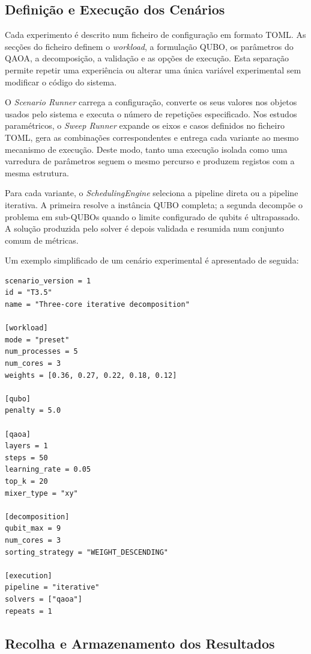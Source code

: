 \subsection{Definição e Execução dos Cenários}

Cada experimento é descrito num ficheiro de configuração em formato TOML. As secções
do ficheiro definem o \textit{workload}, a formulação QUBO, os parâmetros do QAOA, a
decomposição, a validação e as opções de execução. Esta separação permite repetir uma
experiência ou alterar uma única variável experimental sem modificar o código do
sistema.

O \textit{Scenario Runner} carrega a configuração, converte os seus valores nos objetos
usados pelo sistema e executa o número de repetições especificado. Nos estudos
paramétricos, o \textit{Sweep Runner} expande os eixos e casos definidos no ficheiro TOML,
gera as combinações correspondentes e entrega cada variante ao mesmo mecanismo de
execução. Deste modo, tanto uma execução isolada como uma varredura de parâmetros seguem
o mesmo percurso e produzem registos com a mesma estrutura.

Para cada variante, o \textit{SchedulingEngine} seleciona a pipeline direta ou a pipeline
iterativa. A primeira resolve a instância QUBO completa; a segunda decompõe o problema em
sub-QUBOs quando o limite configurado de qubits é ultrapassado. A solução produzida pelo
solver é depois validada e resumida num conjunto comum de métricas.

Um exemplo simplificado de um cenário experimental é apresentado de seguida:

\begin{lstlisting}[caption={Exemplo simplificado de um cenário experimental em TOML.}]
scenario_version = 1
id = "T3.5"
name = "Three-core iterative decomposition"

[workload]
mode = "preset"
num_processes = 5
num_cores = 3
weights = [0.36, 0.27, 0.22, 0.18, 0.12]

[qubo]
penalty = 5.0

[qaoa]
layers = 1
steps = 50
learning_rate = 0.05
top_k = 20
mixer_type = "xy"

[decomposition]
qubit_max = 9
num_cores = 3
sorting_strategy = "WEIGHT_DESCENDING"

[execution]
pipeline = "iterative"
solvers = ["qaoa"]
repeats = 1
\end{lstlisting}

\subsection{Recolha e Armazenamento dos Resultados}

